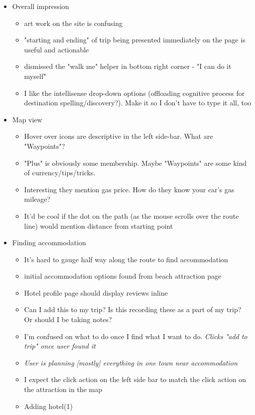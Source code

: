 \begin{itemize}
\item Overall impression
  \begin{itemize}
  \item art work on the site is confusing
  \item "starting and ending" of trip being presented immediately on the page is useful and actionable
  \item dismissed the "walk me" helper in bottom right corner - "I can do it myself"
  \item I like the intellisense drop-down options (offloading cognitive process for destination spelling/discovery?). Make it so I don't have to type it all, too
  \end{itemize}
\item Map view
  \begin{itemize}
  \item Hover over icons are descriptive in the left side-bar. What are "Waypoints"?
  \item "Plus" is obviously some membership. Maybe "Waypoints" are some kind of currency/tips/tricks.
  \item Interesting they mention gas price. How do they know your car's gas mileage?
  \item It'd be cool if the dot on the path (as the mouse scrolls over the route line) would mention distance from starting point
  \end{itemize}
\item Finding accommodation
  \begin{itemize}
  \item It's hard to gauge half way along the route to find accommodation
  \item initial accommodation options found from beach attraction page
  \item Hotel profile page should display reviews inline
  \item Can I add this to my trip? Is this recording these as a part of my trip? Or should I be taking notes?
  \item I'm confused on what to do once I find what I want to do. \textit{Clicks "add to trip" once user found it}
  \item \textit{User is planning [mostly] everything in one town near accommodation}
  \item I expect the click action on the left side bar to match the click action on the attraction in the map
  \item Adding hotel(1)

\end{itemize}
\end{itemize}
